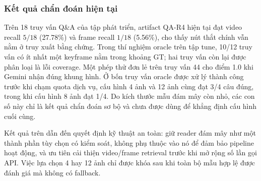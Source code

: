 \subsubsection{Kết quả chẩn đoán hiện tại}

Trên 18 truy vấn Q\&A của tập phát triển, artifact QA-R4 hiện tại đạt video
recall $5/18$ (27.78\%) và frame recall $1/18$ (5.56\%), cho thấy nút thắt
chính vẫn nằm ở truy xuất bằng chứng. Trong thí nghiệm oracle trên tập tune,
10/12 truy vấn có ít nhất một keyframe nằm trong khoảng GT; hai truy vấn còn
lại được phân loại là lỗi coverage. Một phép thử đơn lẻ trên truy vấn 44 cho
điểm 1.0 khi Gemini nhận đúng khung hình. Ở bốn truy vấn oracle được xử lý
thành công trước khi chạm quota dịch vụ, cấu hình 4 ảnh và 12 ảnh cùng đạt
3/4 câu đúng, trong khi cấu hình 8 ảnh đạt 1/4. Do kích thước mẫu đám mây còn
nhỏ, các con số này chỉ là kết quả chẩn đoán sơ bộ và chưa được dùng để khẳng
định cấu hình cuối cùng.

Kết quả trên dẫn đến quyết định kỹ thuật an toàn: giữ reader đám mây như một
thành phần tùy chọn có kiểm soát, không phụ thuộc vào nó để đảm bảo pipeline
hoạt động, và ưu tiên cải thiện video/frame retrieval trước khi mở rộng số lần
gọi API. Việc lựa chọn 4 hay 12 ảnh chỉ được khóa sau khi toàn bộ mẫu hợp lệ
được đánh giá mà không có fallback.
